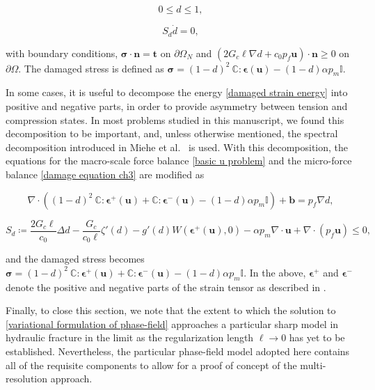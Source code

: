 \begin{equation}
   0 \le d \le 1,
\end{equation}

\begin{equation}
    S_d\dot{d} = 0,
    \label{eq:ddot-strong}
\end{equation}

with boundary conditions, $\boldsymbol\sigma \cdot \textbf{n} = \textbf{t}$ on $\partial \Omega_N$ and $(2G_c\ell\nabla d +c_0p_f\textbf{u})\cdot \textbf{n} \ge 0$ on $\partial \Omega$. The damaged stress is defined as $\boldsymbol\sigma = (1-d)^2\ \mathbb{C}:\boldsymbol\epsilon(\textbf{u}) -(1-d)\alpha p_m \mathbb{I}$.

In some cases, it is useful to decompose the energy \eqref{damaged strain energy} into positive and negative parts, in order to provide asymmetry between tension and compression states. In most problems studied in this manuscript, we found this decomposition to be important, and, unless otherwise mentioned, the spectral decomposition introduced in Miehe et al.~\cite{miehe2010phase} is used. With this decomposition, the equations for the macro-scale force balance \eqref{basic u problem} and the micro-force balance \eqref{damage equation ch3} are modified as

\begin{equation}\label{basic u problem spectral}\tag{22a}
    \nabla \cdot \left( (1-d)^2\ \mathbb{C}:\boldsymbol\epsilon^+(\textbf{u}) + \mathbb{C}:\boldsymbol\epsilon^-(\textbf{u})-(1-d)\alpha p_m \mathbb{I}\right) + \textbf{b} = p_f\nabla d, 
\end{equation}

\begin{equation}\label{damage equation spectral}\tag{23a}
    S_d \coloneqq  \dfrac{2G_c\ell}{c_0}\Delta d - \dfrac{G_c}{c_0\ell}\zeta'(d)-g'(d)W(\boldsymbol{\epsilon^+}(\boldsymbol{\textbf{u}}),0) - \alpha p_m\nabla \cdot \textbf{u} + \nabla \cdot (p_f\textbf{u}) \le 0,
\end{equation}

and the damaged stress becomes $\boldsymbol\sigma = (1-d)^2\ \mathbb{C}:\boldsymbol\epsilon^+(\textbf{u}) + \mathbb{C}:\boldsymbol\epsilon^-(\textbf{u})-(1-d)\alpha p_m \mathbb{I}$. In the above, $\boldsymbol\epsilon^+$ and $\boldsymbol\epsilon^-$ denote the positive and negative parts of the strain tensor as described in \cite{miehe2010phase}. 

Finally, to close this section, we note that the extent to which the solution to \eqref{variational formulation of phase-field} approaches a particular sharp model in hydraulic fracture in the limit as the regularization length $\ell\rightarrow 0$ has yet to be established.  Nevertheless, the particular phase-field model adopted here contains all of the requisite components to allow for a proof of concept of the multi-resolution approach.  




